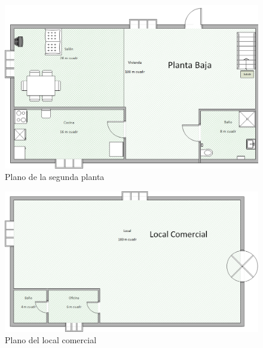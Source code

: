 \begin{landscape}
	\begin{figure}[H]
		\centering
		\includegraphics[scale=0.80]{../img/PlanoVivienda2.png}
		\caption{Plano de la segunda planta}
	\end{figure}
\end{landscape}

\begin{landscape}
	\begin{figure}[H]
		\centering
		\includegraphics[scale=0.90]{../img/PlanoLocal.png}
		\caption{Plano del local comercial}
	\end{figure}
\end{landscape}

